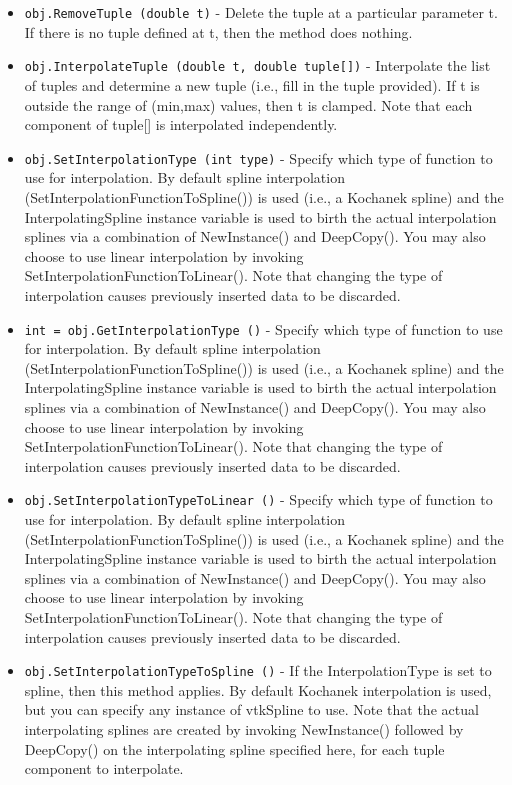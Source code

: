 \begin{itemize}
\item  \verb|obj.RemoveTuple (double t)| -  Delete the tuple at a particular parameter t. If there is no
 tuple defined at t, then the method does nothing.

\item  \verb|obj.InterpolateTuple (double t, double tuple[])| -  Interpolate the list of tuples and determine a new tuple (i.e.,
 fill in the tuple provided). If t is outside the range of
 (min,max) values, then t is clamped. Note that each component
 of tuple[] is interpolated independently.

\item  \verb|obj.SetInterpolationType (int type)| -  Specify which type of function to use for interpolation. By default
 spline interpolation (SetInterpolationFunctionToSpline()) is used
 (i.e., a Kochanek spline) and the InterpolatingSpline instance variable
 is used to birth the actual interpolation splines via a combination of
 NewInstance() and DeepCopy(). You may also choose to use linear
 interpolation by invoking SetInterpolationFunctionToLinear(). Note that
 changing the type of interpolation causes previously inserted data
 to be discarded.

\item  \verb|int = obj.GetInterpolationType ()| -  Specify which type of function to use for interpolation. By default
 spline interpolation (SetInterpolationFunctionToSpline()) is used
 (i.e., a Kochanek spline) and the InterpolatingSpline instance variable
 is used to birth the actual interpolation splines via a combination of
 NewInstance() and DeepCopy(). You may also choose to use linear
 interpolation by invoking SetInterpolationFunctionToLinear(). Note that
 changing the type of interpolation causes previously inserted data
 to be discarded.

\item  \verb|obj.SetInterpolationTypeToLinear ()| -  Specify which type of function to use for interpolation. By default
 spline interpolation (SetInterpolationFunctionToSpline()) is used
 (i.e., a Kochanek spline) and the InterpolatingSpline instance variable
 is used to birth the actual interpolation splines via a combination of
 NewInstance() and DeepCopy(). You may also choose to use linear
 interpolation by invoking SetInterpolationFunctionToLinear(). Note that
 changing the type of interpolation causes previously inserted data
 to be discarded.

\item  \verb|obj.SetInterpolationTypeToSpline ()| -  If the InterpolationType is set to spline, then this method applies. By
 default Kochanek interpolation is used, but you can specify any instance
 of vtkSpline to use. Note that the actual interpolating splines are
 created by invoking NewInstance() followed by DeepCopy() on the
 interpolating spline specified here, for each tuple component to
 interpolate.


\end{itemize}
